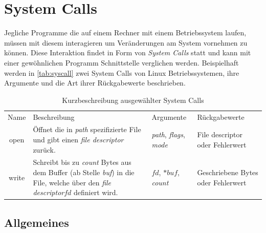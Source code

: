     \section{System Calls}\label{sec:syscalls}
        Jegliche Programme die auf einem Rechner mit einem Betriebssystem laufen, müssen mit diesem interagieren um Veränderungen am System vornehmen zu können.
        Diese Interaktion findet in Form von \textit{System Calls} statt und kann mit einer gewöhnlichen Programm Schnittstelle verglichen werden.
        Beispielhaft werden in \autoref{tab:syscall} zwei System Calls von Linux Betriebssystemen, ihre Argumente und die Art ihrer Rückgabewerte beschrieben.

        \begin{table}[H]
            \small
            \centering
            \begin{tabular}{cp{4cm}p{2cm}p{3cm}}
                \hline
                \rowcolor{GruvGray!36}
                \multicolumn{4}{c}{System Calls}\\
                \hline
                Name & Beschreibung & Argumente & Rückgabewerte\\
                \hline
                \hline
                \rowcolor{GruvGray!16}
                open& Öffnet die in \textit{path} spezifizierte File und gibt einen \textit{file descriptor} zurück.& \textit{path}, \textit{flags}, \textit{mode} & File descriptor oder Fehlerwert\\
                write& Schreibt bis zu \textit{count} Bytes aus dem Buffer (ab Stelle \textit{buf}) in die File, welche über den \textit{file descriptor}$fd$ definiert wird. & $fd$, $*buf$, \textit{count} & Geschriebene Bytes oder Fehlerwert\\
                \hline
            \end{tabular}
            \caption{Kurzbeschreibung ausgewählter System Calls}
            \label{tab:syscall}
        \end{table}

        \subsection{Allgemeines}\label{sec:syscall_allg}

